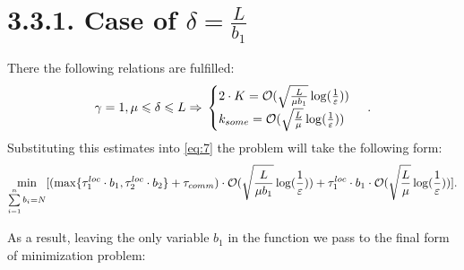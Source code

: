 \documentclass{article}
\theoremstyle{definition}
\theoremstyle{plain}
\begin{document}
\section*{3.3.1. Case of $\delta = \frac{L}{b_1}$}

There the following relations are fulfilled:
\begin{equation}
    \notag
    \gamma = 1, \mu \leq \delta \leq L \Rightarrow 
    \\
    \notag
    \begin{cases}
      2\cdot K =  \mathcal O(\sqrt{\frac{L}{\mu b_1}}\log(\frac{1}{\varepsilon}))\\
      k_{some} = \mathcal O(\sqrt{\frac{L}{\mu}}\log(\frac{1}{\varepsilon}))
    \end{cases}\,.
\end{equation}
Substituting this estimates into \eqref{eq:7}  the problem will take the following form:
\begin{equation}
    \notag
    \underset{\sum\limits_{i = 1}^{n} b_i = N}{\min}[(\max\{\tau_1^{loc}\cdot b_1, \tau_2^{loc}\cdot b_2\} + \tau_{comm}) \cdot \mathcal O(\sqrt{\frac{L}{\mu {b_1}}}\log(\frac{1}{\varepsilon})) + \tau_1^{loc}\cdot b_1 \cdot \mathcal O(\sqrt{\frac{L}{\mu}}\log(\frac{1}{\varepsilon}))].
\end{equation}

As a result, leaving the only variable $b_1$ in the function we pass to the final form of minimization problem:
\end{document}
